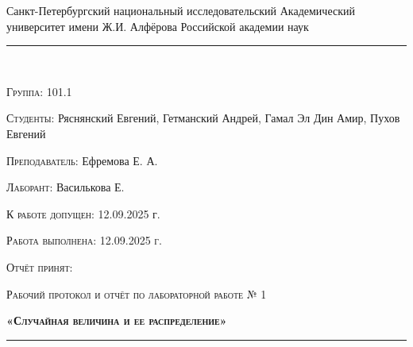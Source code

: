 \documentclass[12pt]{article}
\begin{document}
\begin{center}
    \large\textrm{Санкт-Петербургский национальный исследовательский Академический университет имени Ж.И. Алфёрова Российской академии наук}
\end{center}

\noindent\rule{\textwidth}{0.5pt}\\

\begin{minipage}{0.5\textwidth}
  \begin{flushleft}
	\textsc{Группа:} 101.1
	
	\textsc{Студенты:} Ряснянский Евгений, Гетманский Андрей, Гамал Эл Дин Амир, Пухов Евгений
	
	\textsc{Преподаватель:} Ефремова Е. А.
	
	\textsc{Лаборант:} Василькова Е.
  \end{flushleft}
\end{minipage}
\begin{minipage}{0.5\textwidth}
  \begin{flushleft}
	\textsc{К работе допущен:} 12.09.2025 г.
	
	\textsc{Работа выполнена: 12.09.2025 г.}
	
	\textsc{Отчёт принят:}
  \end{flushleft}
\end{minipage}


\begin{center}
     \large\textsc{Рабочий протокол и отчёт по лабораторной работе № 1}
    
    \textbf{\textsc{«Случайная величина и ее распределение»}}
\end{center}

\noindent\rule{\textwidth}{0.5pt}\\
\end{document}
